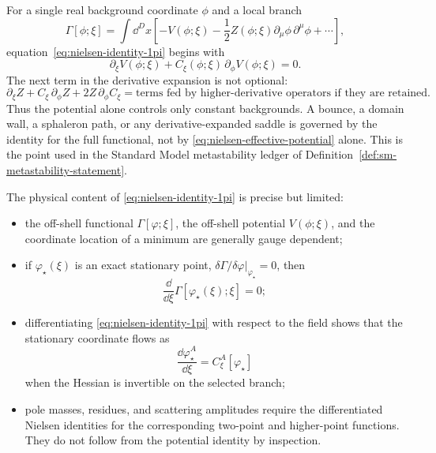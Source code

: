For a single real background coordinate \(\phi\) and a local branch
\[
  \Gamma[\phi;\xi]
  =
  \int\dd^D x
  \left[
    -V(\phi;\xi)
    -\frac12 Z(\phi;\xi)\partial_\mu\phi\,\partial^\mu\phi
    +\cdots
  \right],
\]
equation~\eqref{eq:nielsen-identity-1pi} begins with
\begin{equation}
  \partial_\xi V(\phi;\xi)
  +
  C_\xi(\phi;\xi)\,\partial_\phi V(\phi;\xi)=0 .
  \label{eq:nielsen-effective-potential}
\end{equation}
The next term in the derivative expansion is not optional:
\begin{equation}
  \partial_\xi Z
  +
  C_\xi\,\partial_\phi Z
  +
  2Z\,\partial_\phi C_\xi
  =
  \text{terms fed by higher-derivative operators if they are retained}.
  \label{eq:nielsen-derivative-expansion-z}
\end{equation}
Thus the potential alone controls only constant backgrounds.  A bounce, a
domain wall, a sphaleron path, or any derivative-expanded saddle is governed
by the identity for the full functional, not by
\eqref{eq:nielsen-effective-potential} alone.  This is the point used in the
Standard Model metastability ledger of
Definition~\ref{def:sm-metastability-statement}.

The physical content of \eqref{eq:nielsen-identity-1pi} is precise but
limited:
\begin{itemize}
\item the off-shell functional \(\Gamma[\varphi;\xi]\), the off-shell
      potential \(V(\phi;\xi)\), and the coordinate location of a minimum
      are generally gauge dependent;
\item if \(\varphi_\star(\xi)\) is an exact stationary point,
      \(\delta\Gamma/\delta\varphi|_{\varphi_\star}=0\), then
      \[
        \frac{\dd}{\dd\xi}\Gamma[\varphi_\star(\xi);\xi]=0 ;
      \]
\item differentiating \eqref{eq:nielsen-identity-1pi} with respect to the
      field shows that the stationary coordinate flows as
      \[
        \frac{\dd\varphi_\star^A}{\dd\xi}
        =
        C_\xi^A[\varphi_\star]
      \]
      when the Hessian is invertible on the selected branch;
\item pole masses, residues, and scattering amplitudes require the
      differentiated Nielsen identities for the corresponding two-point and
      higher-point functions.  They do not follow from the potential identity
      by inspection.
\end{itemize}

